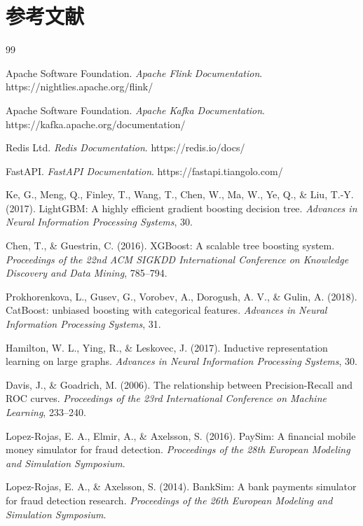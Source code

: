 \section*{\centering\heiti{}参考文献}
\begin{thebibliography}{99}

Apache Software Foundation.
\textit{Apache Flink Documentation}.
https://nightlies.apache.org/flink/

Apache Software Foundation.
\textit{Apache Kafka Documentation}.
https://kafka.apache.org/documentation/

Redis Ltd.
\textit{Redis Documentation}.
https://redis.io/docs/

FastAPI.
\textit{FastAPI Documentation}.
https://fastapi.tiangolo.com/

Ke, G., Meng, Q., Finley, T., Wang, T., Chen, W., Ma, W., Ye, Q., \& Liu, T.-Y. (2017).
LightGBM: A highly efficient gradient boosting decision tree.
\textit{Advances in Neural Information Processing Systems}, 30.

Chen, T., \& Guestrin, C. (2016).
XGBoost: A scalable tree boosting system.
\textit{Proceedings of the 22nd ACM SIGKDD International Conference on Knowledge Discovery and Data Mining}, 785--794.

Prokhorenkova, L., Gusev, G., Vorobev, A., Dorogush, A. V., \& Gulin, A. (2018).
CatBoost: unbiased boosting with categorical features.
\textit{Advances in Neural Information Processing Systems}, 31.

Hamilton, W. L., Ying, R., \& Leskovec, J. (2017).
Inductive representation learning on large graphs.
\textit{Advances in Neural Information Processing Systems}, 30.

Davis, J., \& Goadrich, M. (2006).
The relationship between Precision-Recall and ROC curves.
\textit{Proceedings of the 23rd International Conference on Machine Learning}, 233--240.

Lopez-Rojas, E. A., Elmir, A., \& Axelsson, S. (2016).
PaySim: A financial mobile money simulator for fraud detection.
\textit{Proceedings of the 28th European Modeling and Simulation Symposium}.

Lopez-Rojas, E. A., \& Axelsson, S. (2014).
BankSim: A bank payments simulator for fraud detection research.
\textit{Proceedings of the 26th European Modeling and Simulation Symposium}.


\end{thebibliography}
